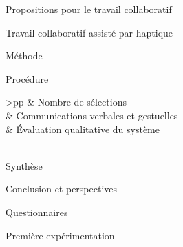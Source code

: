 \documentclass[myfrancais]{mythesis}
\begin{document}
\begin{mypart}{Propositions pour le travail collaboratif}
\begin{mychapter}{Travail collaboratif assisté par haptique}
\begin{mysection}{Méthode}
\begin{mysubsection}{Procédure}
\begin{mytable}
\begin{mytabular}{>{\bfseries}p{\expfourfirstcolumn}p{\expfoursecondcolumn}}
							                                          &  Nombre de sélections                                           \\
							                                          &  Communications verbales et gestuelles                          \\
							                                          &  Évaluation qualitative du système                              \\
							\mymiddlerule[\heavyrulewidth]
							 \\
							\mybottomrule
						\end{mytabular}
					\end{mytable}
				\end{mysubsection}
			\end{mysection}
		\end{mychapter}
	\end{mypart}
	\begin{mypart}{Synthèse}
		\begin{mychapter}{Conclusion et perspectives}
		\end{mychapter}
	\end{mypart}

	\myglossary
	\myappendix
	\begin{mychapter}{Questionnaires}
		\begin{mysection}{Première expérimentation}
		\end{mysection}
	\end{mychapter}
\end{document}
